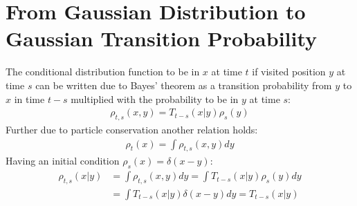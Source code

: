 \documentclass[
  a4paper,BCOR10mm,twoside,
  headsepline,footsepline,%
  fleqn,openbib
]{scrbook}
\begin{document}
\section{From Gaussian Distribution to Gaussian Transition Probability}\label{baystheorem}
The conditional distribution function to be in $x$ at time $t$ if visited position $y$ at time $s$   can be written due to Bayes' theorem as a transition probability from $y$ to $x$ in time $t-s$ multiplied with the probability to be in $y$ at time $s$:
\begin{align}
 \rho_{t,s}(x,y)=T_{t-s}(x|y) \rho_s(y)
\end{align}
Further due to particle conservation another relation holds:
\begin{align}
 \rho_{t}(x)= \int \rho_{t,s}(x,y) dy
\end{align}
Having an initial condition $\rho_{s}(x)= \delta(x-y)$:
\begin{align}
 \rho_{t,s}(x|y)&= \int \rho_{t,s}(x,y) dy = \int T_{t-s}(x|y) \rho_s(y) dy\\
 &= \int T_{t-s}(x|y) \delta(x-y) dy 
 = T_{t-s}(x|y)
\end{align}
\end{document}
